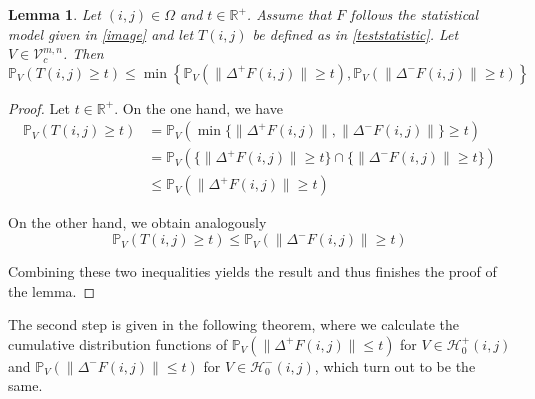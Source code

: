 \documentclass[a4paper,12pt]{article}
\newcommand{\norm}[1]{\lVert#1\rVert}
\theoremstyle{plain}
\newtheorem{lemma}[theorem]{Lemma}
\theoremstyle{definition}
\begin{document}
\begin{lemma}\label{lemtypeIbound}
	Let $(i, j) \in \Omega$ and $t \in \mathbb{R}^+$. Assume that $F$ follows the statistical model given in \eqref{image} and let $T(i, j)$ be defined as in \eqref{teststatistic}. Let $V \in \mathcal{V}_c^{m, n}$. Then
	\begin{equation}\label{eqtypeIbound}
		\mathbb{P}_V( T(i, j) \geq t ) \leq \min \left\{ \mathbb{P}_V( \norm{\Delta^+ F(i, j)} \geq t ), \mathbb{P}_V( \norm{\Delta^- F(i, j)} \geq t ) \right\}
	\end{equation}
\end{lemma}
\begin{proof}
	Let $t \in \mathbb{R}^+$. On the one hand, we have
	\begin{align*}
		\mathbb{P}_V( T(i, j) \geq t ) &= \mathbb{P}_V( \min \{ \norm{\Delta^+ F(i, j)}, \norm{\Delta^- F(i, j)} \} \geq t ) \\
		&= \mathbb{P}_V( \{ \norm{\Delta^+ F(i, j)} \geq t \} \cap \{ \norm{\Delta^- F(i, j)} \geq t \} ) \\
		&\leq \mathbb{P}_V( \norm{\Delta^+ F(i, j)} \geq t )
	\end{align*}
	
	On the other hand, we obtain analogously
	\begin{equation*}
		\mathbb{P}_V( T(i, j) \geq t ) \leq \mathbb{P}_V( \norm{\Delta^- F(i, j)} \geq t )
	\end{equation*}
	
	Combining these two inequalities yields the result and thus finishes the proof of the lemma.
\end{proof}

The second step is given in the following theorem, where we calculate the cumulative distribution functions of $\mathbb{P}_V( \norm{\Delta^+ F(i, j)} \leq t )$ for $V \in \mathcal{H}_0^+(i, j)$ and $\mathbb{P}_V( \norm{\Delta^- F(i, j)} \leq t )$ for $V \in \mathcal{H}_0^-(i, j)$, which turn out to be the same.
\end{document}

